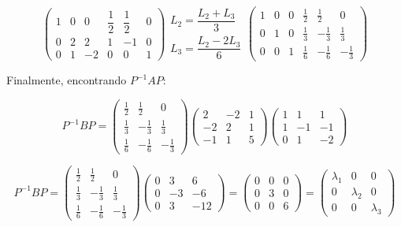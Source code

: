 \begin{enumerate}
	$$
	\begin{pmatrix}
		1 & 0 & 0  & \dfrac{1}{2} & \dfrac{1}{2} & 0\\
		0 & 2 & 2 & 1 & -1 & 0\\
		0 & 1 & -2 & 0 & 0 & 1
	\end{pmatrix}
	\begin{array}{c}
		L_2 = \dfrac{L_2 + L_3}{3} \\
		L_3 = \dfrac{L_2 - 2L_3}{6}
	\end{array}
	\begin{pmatrix}
		1 & 0 & 0  & \frac{1}{2} & \frac{1}{2} & 0\\
		0 & 1 & 0 & \frac{1}{3} & -\frac{1}{3} & \frac{1}{3}\\
		0 & 0 & 1 & \frac{1}{6} & -\frac{1}{6} & -\frac{1}{3}
	\end{pmatrix}
	$$
	
	Finalmente, encontrando $P^{-1}AP$:
	
	$$
	P^{-1}BP = 
	\begin{pmatrix}
		\frac{1}{2} & \frac{1}{2} & 0\\
		\frac{1}{3} & -\frac{1}{3} & \frac{1}{3}\\
		\frac{1}{6} & -\frac{1}{6} & -\frac{1}{3}
	\end{pmatrix}
	\begin{pmatrix}
		2 &  -2 & 1 \\
		-2 & 2 & 1 \\
		-1 &  1 & 5
	\end{pmatrix}
	\begin{pmatrix}
		1 & 1 & 1 \\
		1 & -1 & -1 \\
		0 & 1 & -2
	\end{pmatrix}
	$$
	
	$$
	P^{-1}BP = 
	\begin{pmatrix}
		\frac{1}{2} & \frac{1}{2} & 0\\
		\frac{1}{3} & -\frac{1}{3} & \frac{1}{3}\\
		\frac{1}{6} & -\frac{1}{6} & -\frac{1}{3}
	\end{pmatrix}
	\begin{pmatrix}
		0 & 3 & 6 \\
		0 & -3 & -6 \\
		0 & 3 & -12
	\end{pmatrix}
	=
	\begin{pmatrix}
		0 & 0 & 0 \\
		0 & 3 & 0 \\
		0 & 0 & 6
	\end{pmatrix}
	= 
	\begin{pmatrix}
		\lambda_1 & 0 & 0 \\
		0 & \lambda_2 & 0 \\
		0 & 0 & \lambda_3
	\end{pmatrix}
	$$
	

\end{enumerate}
